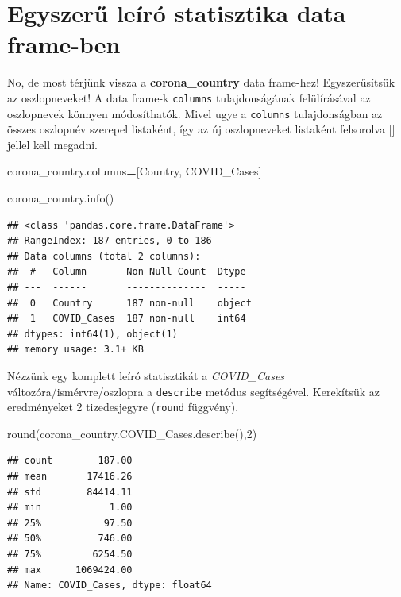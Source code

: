 \documentclass[
]{book}
\newenvironment{Shaded}{\begin{snugshade}}{\end{snugshade}}
\newcommand{\BuiltInTok}[1]{#1}
\newcommand{\DecValTok}[1]{\textcolor[rgb]{0.00,0.00,0.81}{#1}}
\newcommand{\NormalTok}[1]{#1}
\newcommand{\OperatorTok}[1]{\textcolor[rgb]{0.81,0.36,0.00}{\textbf{#1}}}
\newcommand{\StringTok}[1]{\textcolor[rgb]{0.31,0.60,0.02}{#1}}
\begin{document}
\section{Egyszerű leíró statisztika data frame-ben}\label{egyszerux171-leuxedruxf3-statisztika-data-frame-ben}

No, de most térjünk vissza a \textbf{corona\_country} data frame-hez! Egyszerűsítsük az oszlopneveket! A data frame-k \texttt{columns} tulajdonságának felülírásával az oszlopnevek könnyen módosíthatók. Mivel ugye a \texttt{columns} tulajdonságban az összes oszlopnév szerepel listaként, így az új oszlopneveket listaként felsorolva {[}{]} jellel kell megadni.

\begin{Shaded}
\begin{Highlighting}[]
\NormalTok{corona\_country.columns}\OperatorTok{=}\NormalTok{[}\StringTok{\textquotesingle{}Country\textquotesingle{}}\NormalTok{, }\StringTok{\textquotesingle{}COVID\_Cases\textquotesingle{}}\NormalTok{]}

\NormalTok{corona\_country.info()}
\end{Highlighting}
\end{Shaded}

\begin{verbatim}
## <class 'pandas.core.frame.DataFrame'>
## RangeIndex: 187 entries, 0 to 186
## Data columns (total 2 columns):
##  #   Column       Non-Null Count  Dtype 
## ---  ------       --------------  ----- 
##  0   Country      187 non-null    object
##  1   COVID_Cases  187 non-null    int64 
## dtypes: int64(1), object(1)
## memory usage: 3.1+ KB
\end{verbatim}

Nézzünk egy komplett leíró statisztikát a \emph{COVID\_Cases} változóra/ismérvre/oszlopra a \texttt{describe} metódus segítségével. Kerekítsük az eredményeket 2 tizedesjegyre (\texttt{round} függvény).

\begin{Shaded}
\begin{Highlighting}[]
\BuiltInTok{round}\NormalTok{(corona\_country.COVID\_Cases.describe(),}\DecValTok{2}\NormalTok{)}
\end{Highlighting}
\end{Shaded}

\begin{verbatim}
## count        187.00
## mean       17416.26
## std        84414.11
## min            1.00
## 25%           97.50
## 50%          746.00
## 75%         6254.50
## max      1069424.00
## Name: COVID_Cases, dtype: float64
\end{verbatim}
\end{document}
